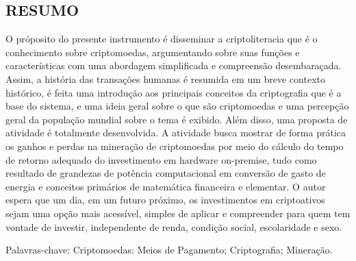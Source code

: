 

\begin{KeepFromToc}
 \chapter*{RESUMO}

\nohyphens{
O próposito do presente instrumento é disseminar a criptoliteracia que é o conhecimento sobre criptomoedas, argumentando sobre suas funções e características com uma abordagem simplificada e compreensão desembaraçada. Assim, a história das transações humanas é resumida em um breve contexto histórico, é feita uma introdução aos principais conceitos da criptografia que é a base do sistema, e uma ideia geral sobre o que são criptomoedas e uma percepção geral da população mundial sobre o tema é exibido. Além disso, uma proposta de atividade é totalmente desenvolvida. A atividade busca mostrar de forma prática os ganhos e perdas na mineração de criptomoedas por meio do cálculo do tempo de retorno adequado do investimento em hardware on-premise, tudo como resultado de grandezas de potência computacional em conversão de gasto de energia e conceitos primários de matemática financeira e elementar. O autor espera que um dia, em um futuro próximo, os investimentos em criptoativos sejam uma opção mais acessível, simples de aplicar e compreender para quem tem vontade de investir, independente de renda, condição social, escolaridade e sexo.\\
}

\noindent
Palavras-chave: Criptomoedas; Meios de Pagamento; Criptografia; Mineração.

\vspace{2cm}



\end{KeepFromToc}
